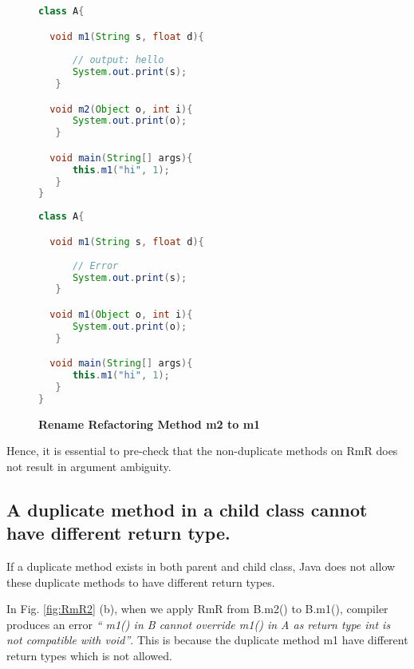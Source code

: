 \begin{figure}[th]
\centering
\begin{minipage}[t]{0.48\linewidth}
\begin{lstlisting}[language=java, basicstyle=\scriptsize\ttfamily,frame=single]
class A{

  void m1(String s, float d){
	
      // output: hello
      System.out.print(s); 
   }

  void m2(Object o, int i){
      System.out.print(o);
   }

  void main(String[] args){
      this.m1("hi", 1);
   }
}
\end{lstlisting}
\end{minipage}
\hfill
\begin{minipage}[t]{0.48\linewidth}
\begin{lstlisting}[language=java, basicstyle=\scriptsize\ttfamily,frame=single]
class A{

  void m1(String s, float d){
	
      // Error
      System.out.print(s); 
   }

  void m1(Object o, int i){
      System.out.print(o);
   }

  void main(String[] args){
      this.m1("hi", 1);
   }
}

\end{lstlisting}
\end{minipage}
\caption{\textbf{Rename Refactoring Method m2 to m1}}
\label{fig:RmR5}
\end{figure}

Hence, it is essential to pre-check that the non-duplicate methods on RmR does not result in argument ambiguity.

\subsection{A duplicate method in a child class cannot have different return type.}

If a duplicate method exists in both parent and child class, Java does not allow these duplicate methods to have different return types.

In Fig. \ref{fig:RmR2} (b), when we apply RmR from B.m2() to B.m1(), compiler produces an error \textsl{`` m1() in B cannot override m1() in A as return type int is not compatible with void''}. This is because the duplicate method m1 have different return types which is not allowed. 

